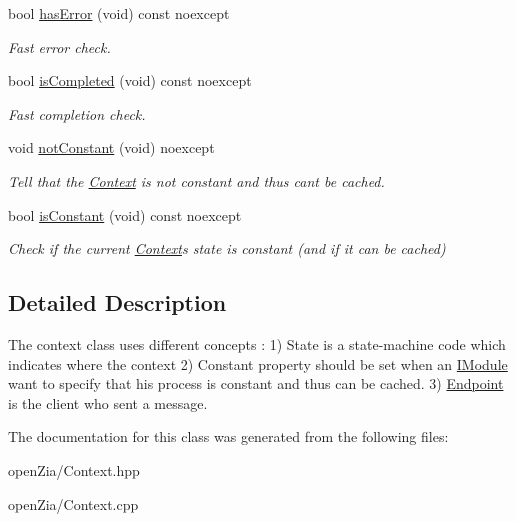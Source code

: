 \begin{DoxyCompactItemize}
\mbox{\label{classo_z_1_1_context_a53afdf1400b5ec8429b09da40662a34d}} 
bool \mbox{\hyperlink{classo_z_1_1_context_a53afdf1400b5ec8429b09da40662a34d}{has\+Error}} (void) const noexcept
\begin{DoxyCompactList}\small\item\em Fast error check. \end{DoxyCompactList}\item 
\mbox{\label{classo_z_1_1_context_ac5dd957a1f76f466b86a179ed3146967}} 
bool \mbox{\hyperlink{classo_z_1_1_context_ac5dd957a1f76f466b86a179ed3146967}{is\+Completed}} (void) const noexcept
\begin{DoxyCompactList}\small\item\em Fast completion check. \end{DoxyCompactList}\item 
\mbox{\label{classo_z_1_1_context_ada521ec57fbc2febfd61177e8bbc0128}} 
void \mbox{\hyperlink{classo_z_1_1_context_ada521ec57fbc2febfd61177e8bbc0128}{not\+Constant}} (void) noexcept
\begin{DoxyCompactList}\small\item\em Tell that the \mbox{\hyperlink{classo_z_1_1_context}{Context}} is not constant and thus can\textquotesingle{}t be cached. \end{DoxyCompactList}\item 
\mbox{\label{classo_z_1_1_context_a748147258019436983fdbbf6ed51c0b6}} 
bool \mbox{\hyperlink{classo_z_1_1_context_a748147258019436983fdbbf6ed51c0b6}{is\+Constant}} (void) const noexcept
\begin{DoxyCompactList}\small\item\em Check if the current \mbox{\hyperlink{classo_z_1_1_context}{Context}}\textquotesingle{}s state is constant (and if it can be cached) \end{DoxyCompactList}\end{DoxyCompactItemize}


\subsection{Detailed Description}
The context class uses different concepts \+: 1) State is a state-\/machine code which indicates where the context 2) Constant property should be set when an \mbox{\hyperlink{classo_z_1_1_i_module}{I\+Module}} want to specify that his process is constant and thus can be cached. 3) \mbox{\hyperlink{classo_z_1_1_endpoint}{Endpoint}} is the client who sent a message. 

The documentation for this class was generated from the following files\+:\begin{DoxyCompactItemize}
\item 
open\+Zia/Context.\+hpp\item 
open\+Zia/Context.\+cpp\end{DoxyCompactItemize}
